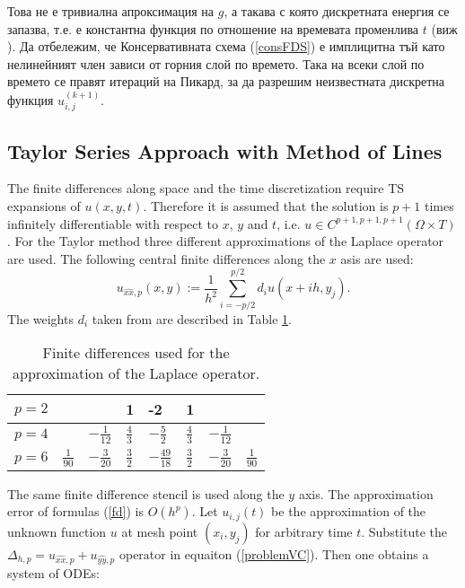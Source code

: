 \documentclass{article}
\newcommand{\rf}[1]{(\ref{#1})}
\begin{document}
Това не е тривиална апроксимация на $g$, а такава с която дискретната енергия се запазва, т.е. е константна функция по отношение на времевата променлива $t$ (виж \cite{ref20}). Да отбележим, че Консервативната схема \rf{consFDS} е имплицитна тъй като нелинейният член зависи от горния слой по времето. Така на всеки слой по времето се правят итераций на Пикард, за да разрешим неизвестната дискретна функция $u^{(k+1)}_{i,j}$.

\subsection{ Taylor Series Approach with Method of Lines }
The finite differences along space and the time discretization require TS expansions of $u(x,y,t)$. Therefore it is assumed that the solution is $p+1$ times infinitely differentiable with respect to $x$, $y$ and $t$, i.e. $u \in C^{p+1,p+1,p+1}(\Omega \times T)$.
For the Taylor method three different approximations of the Laplace operator are used. The following central finite differences along the $x$ asis are used:
\begin{equation}\label{fd}
u_{\widehat{xx},p}(x,y) :=  \frac{1}{h^2} \sum\limits_{i=-p/2}^{p/2} d_i u(x+ih, y_j).
\end{equation}
The weights $d_i$ taken from  \cite{forn} are described in Table \ref{table:A00}. 
\begin{table}[ht]
\centering
\small
		\begin{tabular}{||c|l|l|l|l|l|l|l||}
			\hline
			\hline
            $p=2$          &          &                                 &     1      &   -2   &    1    &    &        \\
   			\hline 
			\hline 
           $p=4$          &                            &   $-\frac{1}{12}$     &     $\frac{4}{3}$      &   $-\frac{5}{2} $     &    $\frac{4}{3}$    &  $-\frac{1}{12}$   &        \\
	   \hline
			\hline 
            $p=6$        &   $\frac{1}{90}$       &     $-\frac{3}{20}$     &    $\frac{3}{2}$      &    $-\frac{49}{18}$   &    $\frac{3}{2}$    & $-\frac{3}{20}$    &    $\frac{1}{90}$       \\
	   \hline
			\hline 
		\end{tabular}
	\caption{ Finite differences used for the approximation of the Laplace operator.}
	\label{table:A00}
\end{table}
The same finite difference stencil is used along the $y$ axis. The approximation error of  formulas \rf{fd} is $O(h^p)$. Let $u_{i,j}(t)$ be the approximation of the unknown function $u$ at mesh point $(x_i, y_j)$ for arbitrary time $t$. Substitute the $\Delta_{h,p} = u_{\widehat{xx},p} + u_{\widehat{yy},p}$ operator in equaiton \rf{problemVC}. Then one obtains a system of ODEs:
\end{document}
